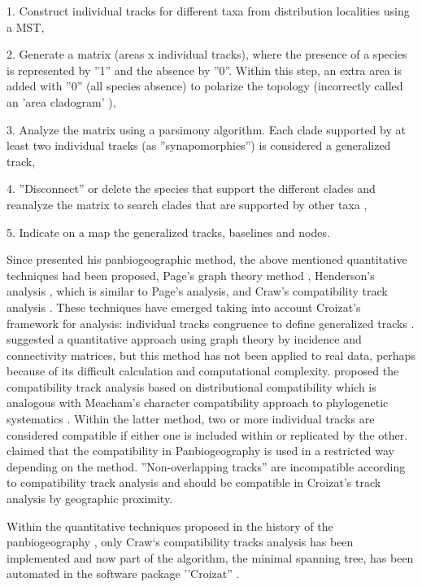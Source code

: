 1. Construct individual tracks for different taxa from distribution localities using a MST,

2. Generate a matrix  (areas x individual tracks), where the presence of a species is represented by ''1'' and the absence by ''0''. Within this step, an extra area is added with ''0'' (all species absence) to polarize the topology (incorrectly called an 'area cladogram' \citep{pae2008}),

3. Analyze the matrix using a parsimony algorithm. Each clade supported by at least two individual tracks (as ''synapomorphies'') is considered a generalized track,

4. ''Disconnect'' or delete the species that support the different clades and reanalyze the matrix to search clades that are supported by other taxa \citep{Garcia-Barros2002},

5. Indicate on a map the generalized tracks, baselines and nodes.

Since \citet{Croizat1958, Croizat1964} presented his panbiogeographic method,
the above mentioned quantitative techniques had been proposed, Page's graph
theory method \citep{Page1987},
Henderson's analysis \citep{Henderson1989}, which is similar to Page's analysis,
and Craw's compatibility track analysis \citep{Craw1989a}. These techniques have
emerged taking
into account Croizat's framework for analysis: individual tracks congruence to
define generalized tracks \citep{Page1987, Henderson1989, Craw1989b}.
\citet{Page1987} suggested a quantitative approach using graph theory by
incidence and connectivity matrices, but this method has not been applied to
real data, perhaps because of its difficult calculation and computational
complexity. \citet{Craw1989a} proposed the compatibility track analysis based on
distributional compatibility which is analogous with Meacham's character
compatibility approach \citep{Meacham1984} to phylogenetic systematics
\citep{Crawetal1999}. Within the latter method, two or more individual tracks
are considered compatible if either one is included within or replicated by the
other. \citet{MorroneCrisci1995} claimed that the compatibility in
Panbiogeography is used in a restricted way depending on the method.
''Non-overlapping tracks'' are incompatible according to compatibility track
analysis and should be compatible in Croizat's track analysis by geographic
proximity.

Within the quantitative techniques proposed in the history of the
panbiogeography \citep{Page1987, Craw1989a, Henderson1989}, only
Craw`s compatibility tracks analysis has been implemented and now part of the
algorithm, the minimal spanning tree, has been automated in the software
package ''Croizat'' \citep{Cavalcanti2009b}.

